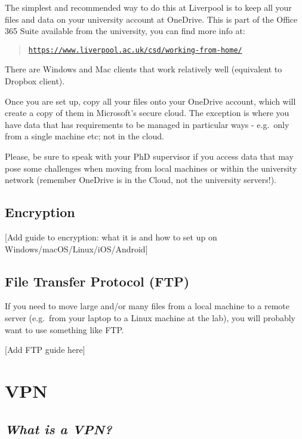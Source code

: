 \documentclass[]{book}
\begin{document}
The simplest and recommended way to do this at Liverpool is to keep all
your files and data on your university account at OneDrive. This is part
of the Office 365 Suite available from the university, you can find more
info at:

\begin{quote}
\href{https://www.liverpool.ac.uk/csd/working-from-home/}{\texttt{https://www.liverpool.ac.uk/csd/working-from-home/}}
\end{quote}

There are Windows and Mac clients that work relatively well (equivalent
to Dropbox client).

Once you are set up, copy all your files onto your OneDrive account,
which will create a copy of them in Microsoft's secure cloud. The
exception is where you have data that has requirements to be managed in
particular ways - e.g.~only from a single machine etc; not in the cloud.

Please, be sure to speak with your PhD supervisor if you access data
that may pose some challenges when moving from local machines or within
the university network (remember OneDrive is in the Cloud, not the
university servers!).

\section{Encryption}\label{encryption}

{[}Add guide to encryption: what it is and how to set up on
Windows/macOS/Linux/iOS/Android{]}

\section{File Transfer Protocol (FTP)}\label{file-transfer-protocol-ftp}

If you need to move large and/or many files from a local machine to a
remote server (e.g.~from your laptop to a Linux machine at the lab), you
will probably want to use something like FTP.

{[}Add FTP guide here{]}

\chapter{VPN}\label{vpn}

\section{\texorpdfstring{\emph{What is a
VPN?}}{What is a VPN?}}\label{what-is-a-vpn}
\end{document}
